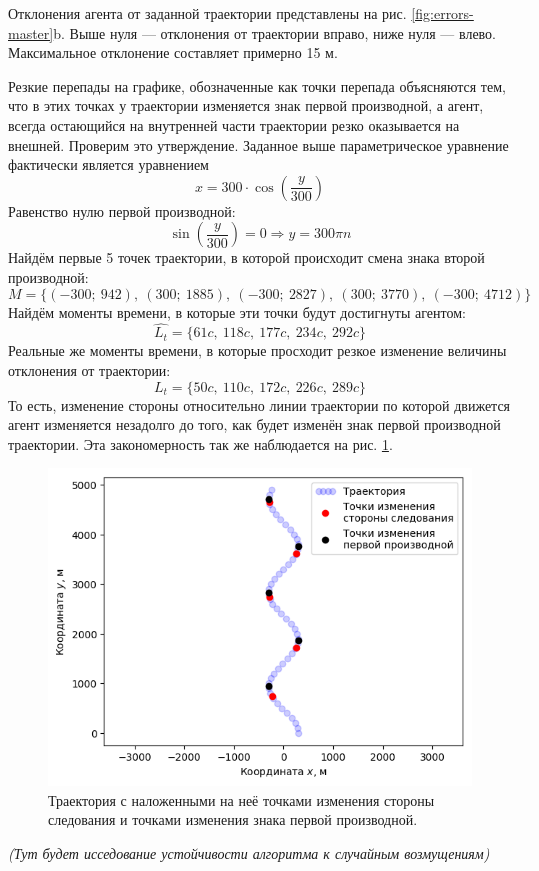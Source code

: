 \documentclass[a4paper, 14pt]{extarticle}
\begin{document}
Отклонения агента от заданной траектории представлены на рис. \ref{fig:errors-master}b. Выше нуля — отклонения от траектории вправо, ниже нуля — влево. Максимальное отклонение составляет примерно 15 м. \par
Резкие перепады на графике, обозначенные как точки перепада объясняются тем, что в этих точках у траектории изменяется знак первой производной, а агент, всегда остающийся на внутренней части траектории резко оказывается на внешней. Проверим это утверждение. Заданное выше параметрическое уравнение фактически является уравнением $$x = 300 \cdot \cos(\frac{y}{300})$$
Равенство нулю первой производной:
$$\sin(\frac{y}{300}) = 0 \Rightarrow y = 300 \pi n$$
Найдём первые 5 точек траектории, в которой происходит смена знака второй производной: $$M = \Big\{(-300; \ 942), \ (300; \ 1885), \ (-300; \ 2827), \ (300; \ 3770), \ (-300; \ 4712)\Big\}$$
Найдём моменты времени, в которые эти точки будут достигнуты агентом:
$$\hat{L_t} = \Big\{ 61c, \ 118c, \ 177c, \ 234c, \ 292c \Big\}$$
Реальные же моменты времени, в которые просходит резкое изменение величины отклонения от траектории:
$${L_t} = \Big\{ 50c, \ 110c, \ 172c, \ 226c, \ 289c \Big\}$$
То есть, изменение стороны относительно линии траектории по которой движется агент изменяется незадолго до того, как будет изменён знак первой производной траектории. Эта закономерность так же наблюдается на рис. \ref{fig:master-trajectory-changes-2}. \par
\begin{figure}[!htbp]
	\centering
	\includegraphics[width=0.5\linewidth]{master-trajectory-changes-2}
	\caption{Траектория с наложенными на неё точками изменения стороны следования и точками изменения знака первой производной.}
	\label{fig:master-trajectory-changes-2}
\end{figure}

\begin{center}{\textit{ (Тут будет исседование устойчивости алгоритма к случайным возмущениям)}}
\end{center}
\end{document}
